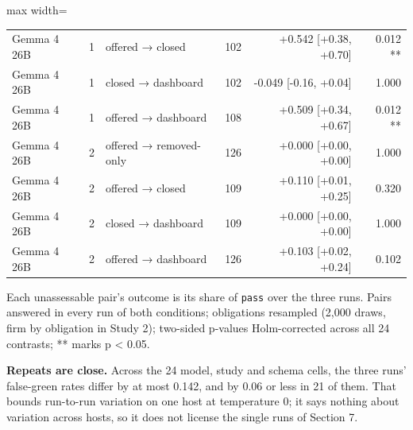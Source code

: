\documentclass[10pt,twocolumn]{article}
\begin{document}
\begin{table}[t]
\begin{adjustbox}{max width=\textwidth}
\begin{tabular}{lrlrrr}
Gemma 4 26B & 1 & offered → closed & 102 & +0.542 [+0.38, +0.70] & 0.012 ** \\
Gemma 4 26B & 1 & closed → dashboard & 102 & -0.049 [-0.16, +0.04] & 1.000 \\
Gemma 4 26B & 1 & offered → dashboard & 108 & +0.509 [+0.34, +0.67] & 0.012 ** \\
Gemma 4 26B & 2 & offered → removed-only & 126 & +0.000 [+0.00, +0.00] & 1.000 \\
Gemma 4 26B & 2 & offered → closed & 109 & +0.110 [+0.01, +0.25] & 0.320 \\
Gemma 4 26B & 2 & closed → dashboard & 109 & +0.000 [+0.00, +0.00] & 1.000 \\
Gemma 4 26B & 2 & offered → dashboard & 126 & +0.103 [+0.02, +0.24] & 0.102 \\
\bottomrule
\end{tabular}
\end{adjustbox}
\par\vspace{3pt}\begin{minipage}{\textwidth}\scriptsize Each unassessable pair's outcome is its share of \texttt{pass} over the three runs. Pairs answered in every run of both conditions; obligations resampled (2,000 draws, firm by obligation in Study 2); two-sided p-values Holm-corrected across all 24 contrasts; ** marks p < 0.05.\end{minipage}
\end{table}

\textbf{Repeats are close.} Across the 24 model, study and schema cells, the three runs' false-green rates differ by at most 0.142, and by 0.06 or less in 21 of them. That bounds run-to-run variation on one host at temperature 0; it says nothing about variation across hosts, so it does not license the single runs of Section 7.
\end{document}
